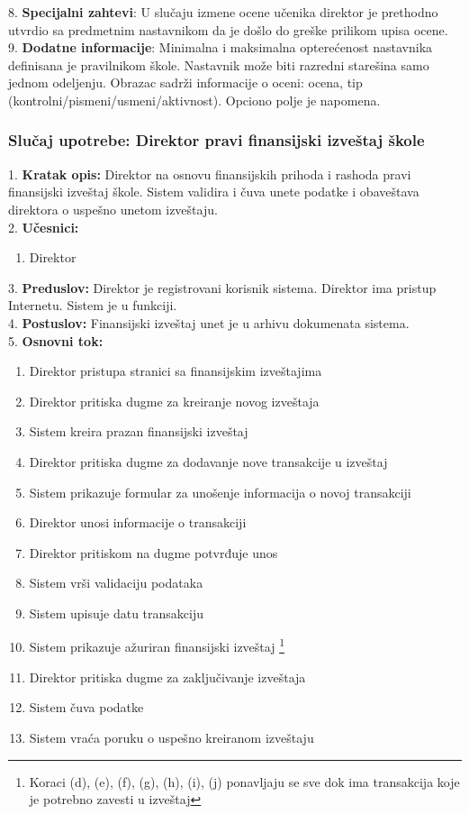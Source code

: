 \documentclass{article}
\begin{document}
8. \textbf{Specijalni zahtevi}: U slučaju izmene ocene učenika direktor je prethodno utvrdio sa predmetnim nastavnikom da je došlo do greške prilikom upisa ocene. \\

9. \textbf{Dodatne informacije}: Minimalna i maksimalna opterećenost nastavnika definisana je pravilnikom škole. Nastavnik može biti razredni starešina samo jednom odeljenju. Obrazac sadrži informacije o oceni: ocena, tip (kontrolni/pismeni/usmeni/aktivnost). Opciono polje je napomena. \\


\subsubsection{Slučaj upotrebe: Direktor pravi finansijski izveštaj škole}
1. \textbf{Kratak opis:} Direktor na osnovu finansijskih prihoda i rashoda pravi finansijski izveštaj škole. Sistem validira i čuva unete podatke i obaveštava direktora o uspešno unetom izveštaju. \\

2. \textbf{Učesnici:}
\begin{enumerate} [label=(\alph*)]
\item Direktor
\end{enumerate} 

3. \textbf{Preduslov:} Direktor je registrovani korisnik sistema. Direktor ima pristup Internetu. Sistem je u funkciji. \\

4. \textbf{Postuslov:} Finansijski izveštaj unet je u arhivu dokumenata sistema. \\

5. \textbf{Osnovni tok:} 
\begin{enumerate} [label=(\alph*)]
\item Direktor pristupa stranici sa finansijskim izveštajima
\item Direktor pritiska dugme za kreiranje novog izveštaja
\item Sistem kreira prazan finansijski izveštaj
\item Direktor pritiska dugme za dodavanje nove transakcije u izveštaj
\item Sistem prikazuje formular za unošenje informacija o novoj transakciji
\item Direktor unosi informacije o transakciji
\item Direktor pritiskom na dugme potvrđuje unos
\item Sistem vrši validaciju podataka
\item Sistem upisuje datu transakciju
\item Sistem prikazuje ažuriran finansijski izveštaj \footnote{Koraci (d), (e), (f), (g), (h), (i), (j) ponavljaju se sve dok ima transakcija koje je potrebno zavesti u izveštaj}
\item Direktor pritiska dugme za zaključivanje izveštaja
\item Sistem čuva podatke
\item Sistem vraća poruku o uspešno kreiranom izveštaju

\end{enumerate}
\end{document}

